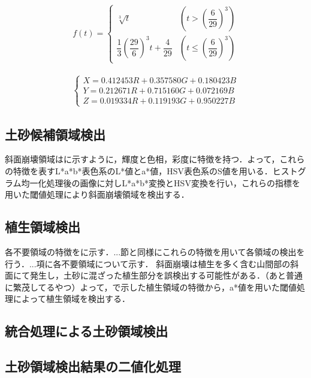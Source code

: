       \begin{eqnarray}
        \label{Lab表色系2}
          f(t) = 
          \left\{
            \begin{array}{lll}
              \sqrt[3]{t} 
                &(t >    (\dfrac{6} {29})^3) \\
              \dfrac{1} {3} (\dfrac{29} {6})^3 t + \dfrac{4} {29}
                &(t \leq (\dfrac{6} {29})^3)
            \end{array}
          \right.
      \end{eqnarray}

      \begin{eqnarray}
        \label{XYZ表色系}
        \left\{
          \begin{array}{l}
            X = 0.412453R + 0.357580G + 0.180423B \\
            Y = 0.212671R + 0.715160G + 0.072169B \\
            Z = 0.019334R + 0.119193G + 0.950227B
          \end{array}
        \right.
      \end{eqnarray}


    \subsection{土砂候補領域検出}
      斜面崩壊領域は\tref{}に示すように，輝度と色相，彩度に特徴を持つ．よって，これらの特徴を表すL*a*b*表色系のL*値とa*値，HSV表色系のS値を用いる．ヒストグラム均一化処理後の画像に対しL*a*b*変換とHSV変換を行い，これらの指標を用いた閾値処理により斜面崩壊領域を検出する．

    \subsection{植生領域検出}
      \label{植生除去}
      各不要領域の特徴を\Fref{}に示す．...節と同様にこれらの特徴を用いて各領域の検出を行う．...項に各不要領域について示す．
      斜面崩壊は植生を多く含む山間部の斜面にて発生し，土砂に混ざった植生部分を誤検出する可能性がある．（あと普通に繁茂してるやつ）よって，\Fref{}で示した植生領域の特徴から，a*値を用いた閾値処理によって植生領域を検出する．

    \subsection{統合処理による土砂領域検出}
    \subsection{土砂領域検出結果の二値化処理}

